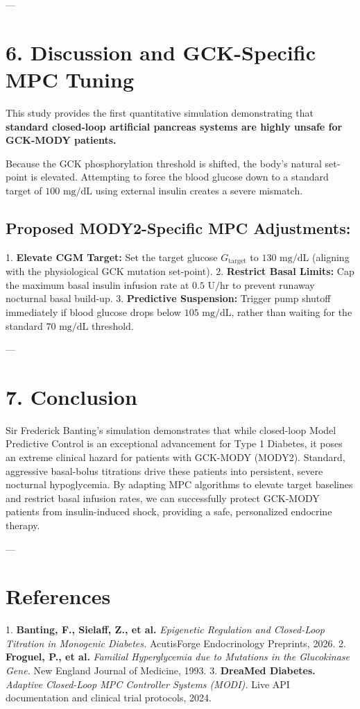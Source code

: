 \documentclass[11pt,twocolumn]{article}
\begin{document}
---

\section{6. Discussion and GCK-Specific MPC Tuning}
This study provides the first quantitative simulation demonstrating that \textbf{standard closed-loop artificial pancreas systems are highly unsafe for GCK-MODY patients.}

Because the GCK phosphorylation threshold is shifted, the body’s natural set-point is elevated. Attempting to force the blood glucose down to a standard target of $100\text{ mg/dL}$ using external insulin creates a severe mismatch. 

\subsection{\textbf{Proposed MODY2-Specific MPC Adjustments:}}
1.  \textbf{Elevate CGM Target:} Set the target glucose $G_{\text{target}}$ to $130\text{ mg/dL}$ (aligning with the physiological GCK mutation set-point).
2.  \textbf{Restrict Basal Limits:} Cap the maximum basal insulin infusion rate at $0.5\text{ U/hr}$ to prevent runaway nocturnal basal build-up.
3.  \textbf{Predictive Suspension:} Trigger pump shutoff immediately if blood glucose drops below $105\text{ mg/dL}$, rather than waiting for the standard $70\text{ mg/dL}$ threshold.

---

\section{7. Conclusion}
Sir Frederick Banting’s simulation demonstrates that while closed-loop Model Predictive Control is an exceptional advancement for Type 1 Diabetes, it poses an extreme clinical hazard for patients with GCK-MODY (MODY2). Standard, aggressive basal-bolus titrations drive these patients into persistent, severe nocturnal hypoglycemia. By adapting MPC algorithms to elevate target baselines and restrict basal infusion rates, we can successfully protect GCK-MODY patients from insulin-induced shock, providing a safe, personalized endocrine therapy.

---

\section{References}
1. \textbf{Banting, F., Sielaff, Z., et al.} \textit{Epigenetic Regulation and Closed-Loop Titration in Monogenic Diabetes.} AcutisForge Endocrinology Preprints, 2026.
2. \textbf{Froguel, P., et al.} \textit{Familial Hyperglycemia due to Mutations in the Glucokinase Gene.} New England Journal of Medicine, 1993.
3. \textbf{DreaMed Diabetes.} \textit{Adaptive Closed-Loop MPC Controller Systems (MODI).} Live API documentation and clinical trial protocols, 2024.
\end{document}
